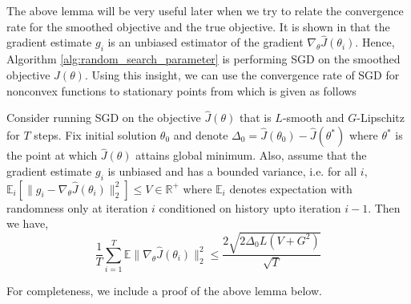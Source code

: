 The above lemma will be very useful later when we try to relate the
convergence rate for the smoothed objective and the true objective. It is shown in
\citep{flaxman2005online, agarwal2010optimal} that the gradient estimate $g_i$ is an
unbiased estimator of the gradient $\nabla_\theta
\hat{J}(\theta_i)$. Hence, Algorithm \ref{alg:random_search_parameter}
is performing SGD on the smoothed objective $\hat{J}(\theta)$. Using
this insight, we can use the convergence rate of SGD for nonconvex
functions to stationary points from \citep{ghadimi2013stochastic} which is given as
follows
\begin{lemma}
  \label{lemma:sgd-parameter}
  Consider running SGD on the objective $\hat{J}(\theta)$ that is
  $L$-smooth and $G$-Lipschitz for $T$ steps. Fix initial solution
  $\theta_0$ and denote $\Delta_0 = \hat{J}(\theta_0) -
  \hat{J}(\theta^*)$ where $\theta^*$ is the point at which
  $\hat{J}(\theta)$ attains global minimum. Also, assume that the
  gradient estimate $g_i$ is unbiased and has a bounded variance,
  i.e. for all $i$, $\mathbb{E}_i[\|g_i - \nabla_\theta
  \hat{J}(\theta_i)\|_2^2] \leq V \in \mathbb{R}^+$ where
  $\mathbb{E}_i$ denotes expectation with randomness only at iteration
  $i$ conditioned on history upto iteration $i-1$. Then we have,
  \begin{equation}
    \frac{1}{T} \sum_{i=1}^T \mathbb{E}\|\nabla_\theta
    \hat{J}(\theta_i)\|_2^2 \leq \frac{2\sqrt{2\Delta_0L(V+G^2)}}{\sqrt{T}}
  \end{equation}
\end{lemma}
For completeness, we include a proof of the above lemma below.
